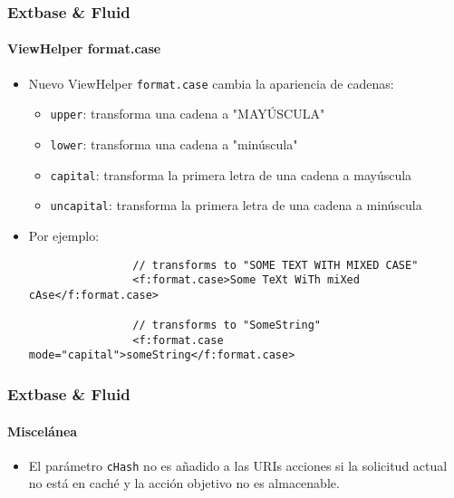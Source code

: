 
\begin{frame}[fragile]
	\frametitle{Extbase \& Fluid}
	\framesubtitle{ViewHelper format.case}

	\begin{itemize}

		\item Nuevo ViewHelper \texttt{format.case} cambia la apariencia de cadenas:
			\begin{itemize}
				\item \texttt{upper}: transforma una cadena a "MAYÚSCULA"
				\item \texttt{lower}: transforma una cadena a "minúscula"
				\item \texttt{capital}: transforma la primera letra de una cadena a mayúscula
				\item \texttt{uncapital}: transforma  la primera letra de una cadena a minúscula
			\end{itemize}

		\item Por ejemplo:

			\begin{lstlisting}
				// transforms to "SOME TEXT WITH MIXED CASE"
				<f:format.case>Some TeXt WiTh miXed cAse</f:format.case>

				// transforms to "SomeString"
				<f:format.case mode="capital">someString</f:format.case>
			\end{lstlisting}

	\end{itemize}

\end{frame}


\begin{frame}[fragile]
	\frametitle{Extbase \& Fluid}
	\framesubtitle{Miscelánea}

	\begin{itemize}

		\item El parámetro \texttt{cHash} no es añadido a las URIs acciones
			si la solicitud actual no está en caché y la acción objetivo no es almacenable.

	\end{itemize}

\end{frame}
